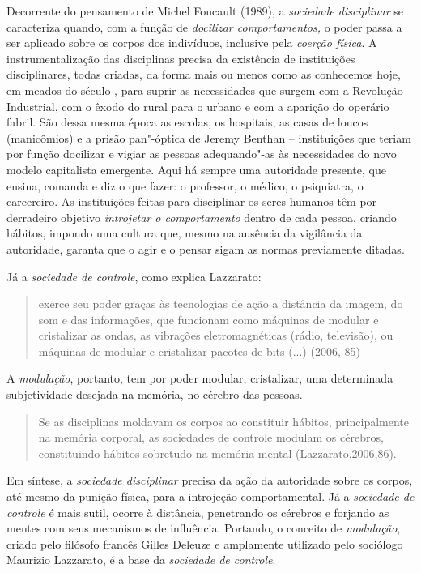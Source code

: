 Decorrente do pensamento de Michel Foucault (1989), a \emph{sociedade
disciplinar} se caracteriza quando, com a função de \emph{docilizar
comportamentos,} o poder passa a ser aplicado sobre os corpos dos
indivíduos, inclusive pela \emph{coerção física}. A instrumentalização
das disciplinas precisa da existência de instituições disciplinares,
todas criadas, da forma mais ou menos como as conhecemos hoje, em meados
do século , para suprir as necessidades que surgem com a Revolução
Industrial, com o êxodo do rural para o urbano e com a aparição do
operário fabril. São dessa mesma época as escolas, os hospitais, as
casas de loucos (manicômios) e a prisão pan"-óptica de Jeremy Benthan --
instituições que teriam por função docilizar e vigiar as pessoas
adequando"-as às necessidades do novo modelo capitalista emergente. Aqui
há sempre uma autoridade presente, que ensina, comanda e diz o que
fazer: o professor, o médico, o psiquiatra, o carcereiro. As
instituições feitas para disciplinar os seres humanos têm por derradeiro
objetivo \emph{introjetar o comportamento} dentro de cada pessoa,
criando hábitos, impondo uma cultura que, mesmo na ausência da
vigilância da autoridade, garanta que o agir e o pensar sigam as normas
previamente ditadas.

Já a \emph{sociedade de controle}, como explica Lazzarato:

\begin{quote}
exerce seu poder graças às tecnologias de ação a distância da imagem, do
som e das informações, que funcionam como máquinas de modular e
cristalizar as ondas, as vibrações eletromagnéticas (rádio, televisão),
ou máquinas de modular e cristalizar pacotes de bits (...) (2006, 85)
\end{quote}

A \emph{modulação}, portanto, tem por poder modular, cristalizar, uma
determinada subjetividade desejada na memória, no cérebro das pessoas.

\begin{quote}
Se as disciplinas moldavam os corpos ao constituir hábitos,
principalmente na memória corporal, as sociedades de controle modulam os
cérebros, constituindo hábitos sobretudo na memória mental
(Lazzarato,2006,86).
\end{quote}

Em síntese, a \emph{sociedade disciplinar} precisa da ação da autoridade
sobre os corpos, até mesmo da punição física, para a introjeção
comportamental. Já a \emph{sociedade de controle} é mais sutil, ocorre à
distância, penetrando os cérebros e forjando as mentes com seus
mecanismos de influência. Portando, o conceito de \emph{modulação},
criado pelo filósofo francês Gilles Deleuze e amplamente utilizado pelo
sociólogo Maurizio Lazzarato, é a base da \emph{sociedade de controle}.

